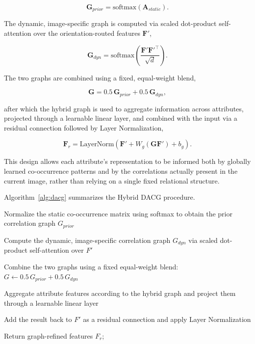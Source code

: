 \documentclass{ieeeaccess}
\begin{document}
\begin{equation}
\mathbf{G}_{prior}=\mathrm{softmax}(\mathbf{A}_{static}).
\label{eq:g_prior}
\end{equation}

The dynamic, image-specific graph is computed via scaled dot-product self-attention over the orientation-routed features $\mathbf{F}'$,

\begin{equation}
\mathbf{G}_{dyn}=\mathrm{softmax}\!\left(\frac{\mathbf{F}'\mathbf{F}'^{\top}}{\sqrt{d}}\right).
\label{eq:g_dyn}
\end{equation}

The two graphs are combined using a fixed, equal-weight blend,

\begin{equation}
\mathbf{G}=0.5\,\mathbf{G}_{prior}+0.5\,\mathbf{G}_{dyn},
\label{eq:g_hybrid}
\end{equation}

after which the hybrid graph is used to aggregate information across attributes, projected through a learnable linear layer, and combined with the input via a residual connection followed by Layer Normalization,

\begin{equation}
\mathbf{F}_{r}=\mathrm{LayerNorm}\!\left(\mathbf{F}'+W_{g}(\mathbf{G}\mathbf{F}')+b_{g}\right).
\label{eq:dacg_output}
\end{equation}

This design allows each attribute's representation to be informed both by globally learned co-occurrence patterns and by the correlations actually present in the current image, rather than relying on a single fixed relational structure.

Algorithm~\ref{alg:dacg} summarizes the Hybrid DACG procedure.
\begin{algorithm}[H]
\caption{Hybrid Dynamic Attribute Correlation Graph (Hybrid DACG)}
\label{alg:dacg}

Normalize the static co-occurrence matrix using softmax to obtain the prior correlation graph $G_{prior}$\;

Compute the dynamic, image-specific correlation graph $G_{dyn}$ via scaled dot-product self-attention over $F'$\;

Combine the two graphs using a fixed equal-weight blend: $G \leftarrow 0.5\,G_{prior}+0.5\,G_{dyn}$\;

Aggregate attribute features according to the hybrid graph and project them through a learnable linear layer\;

Add the result back to $F'$ as a residual connection and apply Layer Normalization\;

Return graph-refined features $F_r$;

\end{algorithm}
\end{document}
